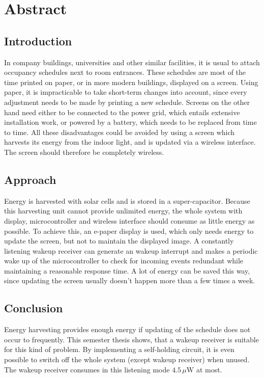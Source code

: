 \chapter*{Abstract}

\section*{Introduction}
In company buildings, universities and other similar facilities, it is usual to attach occupancy schedules next to room entrances. These schedules are most of the time printed on paper, or in more modern buildings, displayed on a screen. Using paper, it is impracticable to take short-term changes into account, since every adjustment needs to be made by printing a new schedule. Screens on the other hand need either to be connected to the power grid, which entails extensive installation work, or powered by a battery, which needs to be replaced from time to time. All these disadvantages could be avoided by using a screen which harvests its energy from the indoor light, and is updated via a wireless interface. The screen should therefore be completely wireless.

\section*{Approach}
Energy is harvested with solar cells and is stored in a super-capacitor.
Because this harvesting unit cannot provide unlimited energy, the whole system with display, microcontroller and wireless interface should consume as little energy as possible.
To achieve this, an e-paper display is used, which only needs energy to update the screen, but not to maintain the displayed image.
A constantly listening wakeup receiver can generate an wakeup interrupt and makes a periodic wake up of the microcontroller to check for incoming events redundant while maintaining a reasonable response time.
A lot of energy can be saved this way, since updating the screen usually doesn't happen more than a few times a week.

\section*{Conclusion}
Energy harvesting provides enough energy if updating of the schedule does not occur to frequently. This semester thesis shows, that a wakeup receiver is suitable for this kind of problem. By implementing a self-holding circuit, it is even possible to switch off the whole system (except wakeup receiver) when unused. The wakeup receiver consumes in this listening mode $4.5\,\mu\text{W}$ at most.